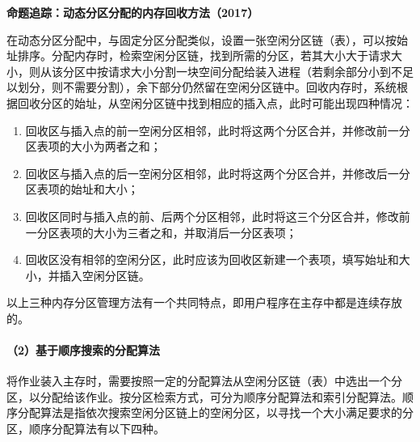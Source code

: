 \documentclass{ctexbook}
\begin{document}
	\textbf{命题追踪：动态分区分配的内存回收方法（2017）}
	
	在动态分区分配中，与固定分区分配类似，设置一张空闲分区链（表），可以按始址排序。分配内存时，检索空闲分区链，找到所需的分区，若其大小大于请求大小，则从该分区中按请求大小分割一块空间分配给装入进程（若剩余部分小到不足以划分，则不需要分割），余下部分仍然留在空闲分区链中。回收内存时，系统根据回收分区的始址，从空闲分区链中找到相应的插入点，此时可能出现四种情况：
	\begin{enumerate}
		\item 回收区与插入点的前一空闲分区相邻，此时将这两个分区合并，并修改前一分区表项的大小为两者之和；
		\item 回收区与插入点的后一空闲分区相邻，此时将这两个分区合并，并修改后一分区表项的始址和大小；
		\item 回收区同时与插入点的前、后两个分区相邻，此时将这三个分区合并，修改前一分区表项的大小为三者之和，并取消后一分区表项；
		\item 回收区没有相邻的空闲分区，此时应该为回收区新建一个表项，填写始址和大小，并插入空闲分区链。
	\end{enumerate}
	
	以上三种内存分区管理方法有一个共同特点，即用户程序在主存中都是连续存放的。
	
	\paragraph{（2）基于顺序搜索的分配算法}
	将作业装入主存时，需要按照一定的分配算法从空闲分区链（表）中选出一个分区，以分配给该作业。按分区检索方式，可分为顺序分配算法和索引分配算法。顺序分配算法是指依次搜索空闲分区链上的空闲分区，以寻找一个大小满足要求的分区，顺序分配算法有以下四种。
	
\end{document}
